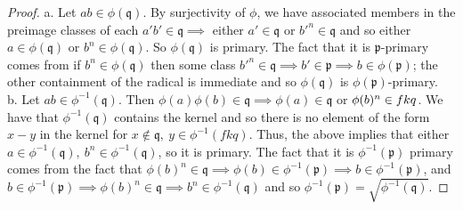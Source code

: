 \documentclass{article}
\newcommand{\fk}[1]{\mathfrak{#1}}
\begin{document}
\begin{proof}
  a. Let $ab \in \phi(\fk{q})$. By surjectivity of $\phi$, we have associated members in the preimage classes of each $a'b' \in \fk{q} \implies$ either $a' \in \fk{q}$ or $b'^{n} \in \fk{q}$ and so either $a \in \phi(\fk{q})$ or $b^{n} \in \phi(\fk{q})$. So $\phi(\fk{q})$ is primary. The fact that it is $\fk{p}$-primary comes from if $b^{n} \in \phi(\fk{q})$ then some class $b'^{n} \in \fk{q} \implies b' \in \fk{p} \implies b \in \phi(\fk{p})$; the other containment of the radical is immediate and so $\phi(\fk{q})$ is $\phi(\fk{p})$-primary. \\
  b. Let $ab \in \phi^{-1}(\fk{q})$. Then $\phi(a)\phi(b) \in \fk{q} \implies \phi(a) \in \fk{q}$ or $\phi(b)^{n} \in \\fk{q}$. We have that $\phi^{-1}(\fk{q})$ contains the kernel and so there is no element of the form $x - y$ in the kernel for $x \notin \fk{q}, \ y \in \phi^{-1}(fk{q})$. Thus, the above implies that either $a \in \phi^{-1}(\fk{q}), \ b^{n} \in \phi^{-1}(\fk{q})$, so it is primary. The fact that it is $\phi^{-1}(\fk{p})$ primary comes from the fact that $\phi(b)^{n} \in \fk{q} \implies \phi(b) \in \phi^{-1}(\fk{p}) \implies b \in \phi^{-1}(\fk{p})$, and $b \in \phi^{-1}(\fk{p}) \implies \phi(b)^{n} \in \fk{q} \implies b^{n} \in \phi^{-1}(\fk{q})$ and so $\phi^{-1}(\fk{p}) = \sqrt{\phi^{-1}(\fk{q})}$.
\end{proof}
\end{document}
